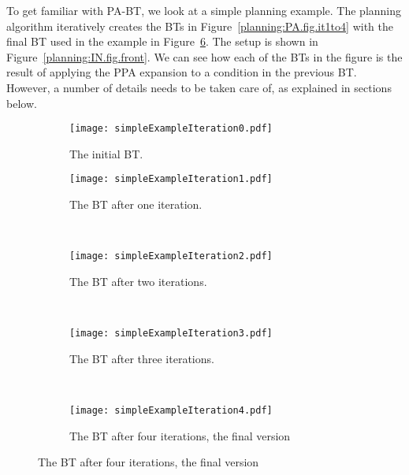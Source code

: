 



To get familiar with PA-BT, we look at a simple planning example. 
The planning algorithm iteratively creates the BTs in Figure~\ref{planning:PA.fig.it1to4} 
with the final BT used  in the example in            
 Figure~\ref{planning:PA.fig.it4}. The setup is shown in Figure~\ref{planning:IN.fig.front}.
 We can see how  each of the BTs in the figure is the result of applying the PPA expansion to a condition in the previous BT.
 However, a number of details needs to be taken care of, as explained in sections below.


\begin{figure}[t]

        \centering
          \begin{subfigure}[b]{0.25\columnwidth}
                \centering
\texttt{[image: simpleExampleIteration0.pdf]}
                \caption{The initial BT.}
                \label{planning:PA.fig.it0}
        \end{subfigure}%
        
        \begin{subfigure}[b]{0.5\columnwidth}
                \centering
\texttt{[image: simpleExampleIteration1.pdf]}
                \caption{The BT after one iteration.}
                \label{planning:PA.fig.it1}
        \end{subfigure}%
       ~ %
        \begin{subfigure}[b]{0.5\columnwidth}
                \centering
\texttt{[image: simpleExampleIteration2.pdf]}
                \caption{The BT after two iterations.}
                \label{planning:PA.fig.it2}              
        \end{subfigure}
        ~ %

        \centering
        \begin{subfigure}[b]{0.45\columnwidth}
                \centering
\texttt{[image: simpleExampleIteration3.pdf]}
                \caption{The BT after three iterations.}
                \label{planning:PA.fig.it3}
        \end{subfigure}%
       ~ %
        \begin{subfigure}[b]{0.55\columnwidth}
                \centering
\texttt{[image: simpleExampleIteration4.pdf]}
                \caption{The BT after four iterations, the final version}
                \label{planning:PA.fig.it4}              
        \end{subfigure}
        

\end{figure}
